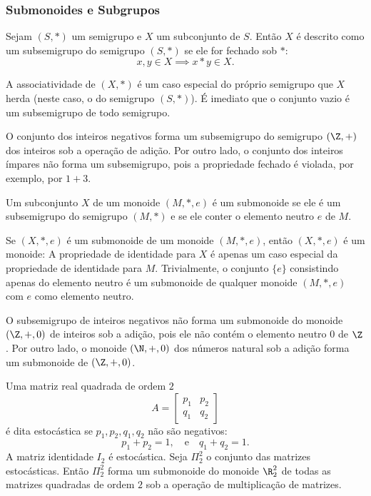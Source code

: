       \subsubsection{Submonoides e Subgrupos}
         \begin{definition}[Subsemigrupos]
            Sejam $(S,*)$ um semigrupo e $X$ um subconjunto de $S$. Então $X$ é descrito como um subsemigrupo do semigrupo $(S,*)$ se ele for fechado sob $*$:
            $$x,y \in X \implies x * y \in X.$$
         \end{definition}
         A associatividade de $(X, *)$ é um caso especial do próprio semigrupo que $X$ herda (neste caso, o do semigrupo $(S,*)$). É imediato que o conjunto vazio é um subsemigrupo de todo semigrupo.
         \begin{exmp}
            O conjunto dos inteiros negativos forma um subsemigrupo do semigrupo $(\Z, +)$ dos inteiros sob a operação de adição. Por outro lado, o conjunto dos inteiros ímpares não forma um subsemigrupo, pois a propriedade fechado é violada, por exemplo, por $1 + 3$.
         \end{exmp}
         \begin{definition}[Submonoides]
            Um subconjunto $X$ de um monoide $(M,*,e)$ é um submonoide se ele é um subsemigrupo do semigrupo $(M,*)$ e se ele conter o elemento neutro $e$ de $M$.
         \end{definition}
         Se $(X,*,e)$ é um submonoide de um monoide $(M,*,e)$, então $(X,*,e)$ é um monoide: 
         A propriedade de identidade para $X$ é apenas um caso especial da propriedade de identidade para $M$. Trivialmente, o conjunto $\{e\}$ consistindo apenas do elemento neutro é um submonoide de qualquer monoide $(M,*,e)$ com $e$ como elemento neutro.
         \begin{exmp}
            O subsemigrupo de inteiros negativos não forma um submonoide do monoide $(\Z,+,0)$ de inteiros sob a adição, pois ele não contém o elemento neutro $0$ de $\Z$. Por outro lado, o monoide $(\N, +,0)$ dos números natural sob a adição forma um submonoide de $(\Z, +,0)$.
         \end{exmp}
         \begin{exmp}
            Uma matriz real quadrada de ordem $2$ $$A=
               \begin{bmatrix}
                  p_{1} & p_{2}\\
                  q_{1} & q_{2}
               \end{bmatrix}$$
            é dita estocástica se $p_{1},p_{2},q_{1},q_{2}$ não são negativos:
            $$p_{1} + p_{2} = 1,\quad \textrm{e}\quad q_{1} + q_{2} = 1.$$
            A matriz identidade $I_{2}$ é estocástica. Seja $\Pi_{2}^{2}$ o conjunto das matrizes estocásticas. Então $\Pi_{2}^{2}$ forma um submonoide do monoide $\R_{2}^{2}$ de todas as matrizes quadradas de ordem $2$ sob a operação de multiplicação de matrizes.
         \end{exmp}
